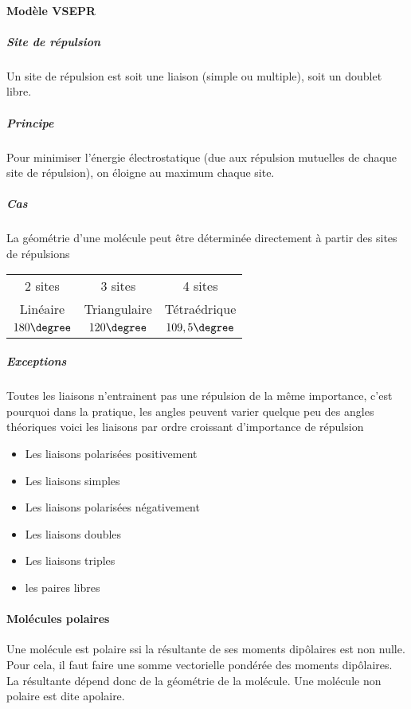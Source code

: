 \documentclass[11pt,a4paper,french]{article}
\begin{document}
\paragraph{Modèle VSEPR}
\subparagraph{Site de répulsion}
Un site de répulsion est soit une liaison (simple ou multiple), soit un doublet libre.

\subparagraph{Principe}
Pour minimiser l'énergie électrostatique (due aux répulsion mutuelles de chaque site de répulsion), on éloigne au maximum chaque site.

\subparagraph{Cas}
La géométrie d'une molécule peut être déterminée directement à partir des sites de répulsions
\begin{center}
	\begin{tabular}{ccc}
		2 sites & 3 sites & 4 sites\\
		Linéaire & Triangulaire & Tétraédrique\\
		$180\degree$ & $120\degree$ & $109,5\degree$\\
	\end{tabular}
\end{center}

\subparagraph{Exceptions}
Toutes les liaisons n'entrainent pas une répulsion de la même importance, c'est pourquoi dans la pratique, les angles peuvent varier quelque peu des angles théoriques voici les liaisons par ordre croissant d'importance de répulsion
\begin{itemize}
	\item Les liaisons polarisées positivement
	\item Les liaisons simples
	\item Les liaisons polarisées négativement
	\item Les liaisons doubles
	\item Les liaisons triples
	\item les paires libres
\end{itemize}

\paragraph{Molécules polaires}
Une molécule est polaire ssi la résultante de ses moments dipôlaires est non nulle. Pour cela, il faut faire une somme vectorielle pondérée des moments dipôlaires. La résultante dépend donc de la géométrie de la molécule. Une molécule non polaire est dite apolaire.
\end{document}
